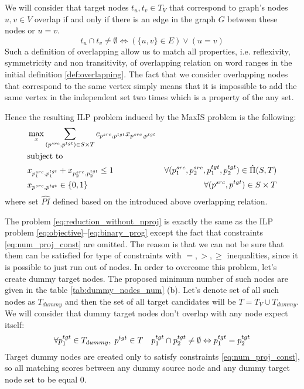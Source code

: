 We will consider that target nodes \( t_u, t_v \in T_{V} \) that correspond to graph's nodes \( u, v \in V \) overlap
if and only if there is an edge in the graph \( G \) between these nodes or \( u = v \).
\begin{equation} \label{eq:overlap_reduction}
  t_u \cap t_v \neq \emptyset \Leftrightarrow
  \left( \{ u, v \} \in E \right) \lor  \left(u = v \right)
\end{equation}
Such a definition of overlapping allow us to match all properties, i.e. reflexivity, symmetricity and non transitivity,
of overlapping relation on word ranges in the initial definition \ref{def:overlapping}. The fact that we consider
overlapping nodes that correspond to the same vertex simply means that it is impossible to
add the same vertex in the independent set two times which is a property of the any set.

Hence the resulting ILP problem induced by the MaxIS problem is the following:
\begin{equation} \label{eq:reduction_without_nproj}
  \begin{aligned}
    & \max\limits_x \sum\limits_{(p^{src}, p^{tgt}) \in S \times T} c_{p^{src}, p^{tgt}} x_{p^{src}, p^{tgt}}                                             \\
    & \text{subject to}                                                                                                                                   \\
    & x_{p_1^{src}, p_1^{tgt}} + x_{p_2^{src}, p_2^{tgt}} \leq 1
    & \forall (p_1^{src}, p_2^{src}, p_1^{tgt}, p_2^{tgt}) \in \hat{\Pi}(S, T)                                                                            \\
    & x_{p^{src}, p^{tgt}} \in \{ 0, 1 \}                                                                     & \forall (p^{src}, p^{tgt}) \in S \times T
  \end{aligned}
\end{equation}
where set \( \hat{PI} \) defined based on the introduced above overlapping relation.

The problem \eqref{eq:reduction_without_nproj} is exactly the same as the ILP problem \eqref{eq:objective}--\eqref{eq:binary_prog}
except the fact that constraints \eqref{eq:num_proj_const} are omitted. The reason is that we can not be sure
that them can be satisfied for type of constraints with \( =, >, \geq \) inequalities, since it is possible to just run out of nodes.
In order to overcome this problem, let's create dummy target nodes. The proposed minimum number of such nodes are given
in the table \ref{tab:dummy_nodes_num} (b). Let's denote set of all such nodes as \( T_{dummy} \) and then the set of all target candidates
will be \( T = T_V \cup T_{dummy} \). We will consider that dummy target nodes don't overlap with any node expect itself:
\[
  \forall p_1^{tgt} \in T_{dummy}, \; p^{tgt} \in T \quad
  p_1^{tgt} \cap p_2^{tgt} \neq \emptyset \Leftrightarrow p_1^{tgt} = p_2^{tgt}
\]
Target dummy nodes are created only to satisfy constraints \eqref{eq:num_proj_const}, so all matching scores
between any dummy source node and any dummy target node set to be equal \( 0 \).

